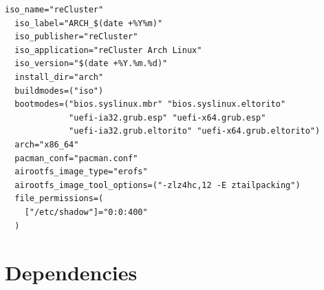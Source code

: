 \begin{lstlisting}[language=shell, morekeywords={[4]{iso_name, iso_label, iso_publisher, iso_application, iso_version, install_dir, buildmodes, bootmodes, arch, pacman_conf, airootfs_image_type, airootfs_image_tool_options, file_permissions}}, xleftmargin=\parindent, label={lst:arch}, caption=Contents of \texttt{profiledef.sh} file which shows the reCluster profile definition]
  iso_name="reCluster"
  iso_label="ARCH_$(date +%Y%m)"
  iso_publisher="reCluster"
  iso_application="reCluster Arch Linux"
  iso_version="$(date +%Y.%m.%d)"
  install_dir="arch"
  buildmodes=("iso")
  bootmodes=("bios.syslinux.mbr" "bios.syslinux.eltorito"
             "uefi-ia32.grub.esp" "uefi-x64.grub.esp"
             "uefi-ia32.grub.eltorito" "uefi-x64.grub.eltorito")
  arch="x86_64"
  pacman_conf="pacman.conf"
  airootfs_image_type="erofs"
  airootfs_image_tool_options=("-zlz4hc,12 -E ztailpacking")
  file_permissions=(
    ["/etc/shadow"]="0:0:400"
  )
\end{lstlisting}

\section{Dependencies}
\label{sec:implementation_dependencies}

